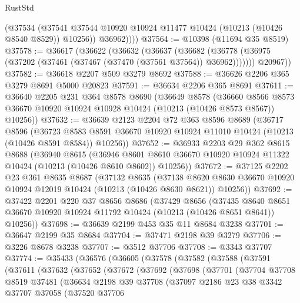 \begin{lexlean}{RustStd}
\begin{coremodule}
{\begin{coremodule}
{{{{{{{{{{{{{{{{{{{{{{{{{{            (@37534
              (@37541 @37544 @10920 @10924 @11477 @10424 (@10213 (@10426 @8540 @8529)) @10256))
            @36962))))
@37564 := @10398 (@11694 @35 @8519)
@37578 := @36617
    (@36622
      (@36632
        (@36637
          (@36682 (@36778 (@36975 (@37202 (@37461 (@37467 (@37470 (@37561 @37564)) @36962)))))))
        @20967))
@37582 := @36618 @2207 @509 @3279 @8692
@37588 := @36626 @2206 @365 @3279 @8691 @5000 @20823
@37591 := @36634 @2206 @365 @8691
@37611 := @36640
    @2205
    @231
    @364
    @8578
    @8690
    (@36649
      @8578
      (@36660 @8566 @8573 @36670 @10920 @10924 @10928 @10424 (@10213 (@10426 @8573 @8567)) @10256))
@37632 := @36639
    @2123
    @2204
    @72
    @363
    @8596
    @8689
    (@36717
      @8596
      (@36723 @8583 @8591 @36670 @10920 @10924 @11010 @10424 (@10213 (@10426 @8591 @8584)) @10256))
@37652 := @36933
    @2203
    @29
    @362
    @8615
    @8688
    (@36940
      @8615
      (@36946 @8601 @8610 @36670 @10920 @10924 @11322 @10424 (@10213 (@10426 @8610 @8602)) @10256))
@37672 := @37125
    @2202
    @23
    @361
    @8635
    @8687
    (@37132
      @8635
      (@37138 @8620 @8630 @36670 @10920 @10924 @12019 @10424 (@10213 (@10426 @8630 @8621)) @10256))
@37692 := @37422
    @2201
    @220
    @37
    @8656
    @8686
    (@37429
      @8656
      (@37435 @8640 @8651 @36670 @10920 @10924 @11792 @10424 (@10213 (@10426 @8651 @8641)) @10256))
@37698 := @36639 @2199 @453 @35 @11 @8684 @3238
@37701 := @36647 @2199 @35 @8684
@37704 := @37471 @2198 @39 @3279
@37706 := @3226 @8678 @3238
@37707 := @3512 @37706
@37708 := @3343 @37707
@37774 := @35433
    (@36576
      (@36605
        (@37578
          (@37582
            (@37588
              (@37591
                (@37611
                  (@37632
                    (@37652
                      (@37672
                        (@37692
                          (@37698
                            (@37701
                              (@37704
                                @37708
                                @8519
                                @37481
                                (@36634
                                  @2198
                                  @39
                                  @37708
                                  (@37097
                                    @2186
                                    @23
                                    @38
                                    @3342
                                    @37707
                                    @37058
                                    (@37520
                                      @37706
}}}}}}}}}}}}}}}}}}}}}}}}}}
\end{coremodule}}
\end{coremodule}
\end{lexlean}
